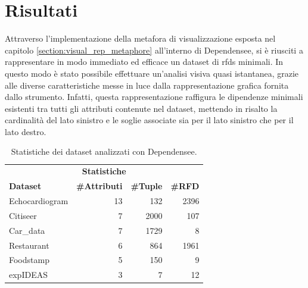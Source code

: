 \section{Risultati}
Attraverso l'implementazione della metafora di visualizzazione esposta nel capitolo \ref{section:visual_rep_metaphore} all'interno di Dependensee, si \`{e} riusciti a rappresentare in modo immediato ed efficace un dataset di \acrlong{rfds} minimali. In questo modo \`{e} stato possibile effettuare un'analisi visiva quasi istantanea, grazie alle diverse caratteristiche messe in luce dalla rappresentazione grafica fornita dallo strumento. Infatti, questa rappresentazione raffigura le dipendenze minimali esistenti tra tutti gli attributi contenute nel dataset, mettendo in risalto la cardinalit\`{a} del lato sinistro e le soglie associate sia per il lato sinistro che per il lato destro.\par
\begin{table}[ht]
\centering
\begin{tabular}{|lrrr|} 
\hline
\multicolumn{4}{|c|}{\textbf{Statistiche}}                                                                                                \\
\textbf{Dataset} & \multicolumn{1}{c}{\textbf{\#Attributi}} & \multicolumn{1}{c}{\textbf{\#Tuple}} & \multicolumn{1}{l|}{\textbf{\#RFD}}  \\ 
\hline
Echocardiogram   & 13                                       & 132                                    & 2396                                 \\
Citiseer   & 7                                        & 2000                                    & 107                                  \\
Car\_data        & 7                                        & 1729                                    & 8                                    \\
Restaurant       & 6                                        & 864                                    & 1961                                 \\
Foodstamp        & 5                                        & 150                                    & 9                                    \\
expIDEAS         & 3                                        & 7                                    & 12                                   \\
\hline
\end{tabular}
\caption{Statistiche dei dataset analizzati con Dependensee.}
\label{table:datasets_analyzed_stats}
\end{table}

